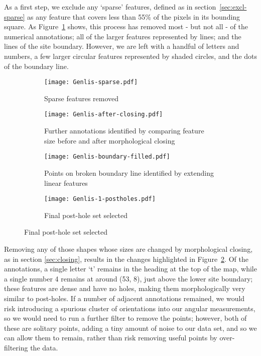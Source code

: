 \documentclass[../../ArchStats.tex]{subfiles}
\begin{document}
As a first step, we exclude any `sparse' features, defined as in section~\ref{sec:excl-sparse} as any feature that covers less than 55\% of the pixels in its bounding square. As Figure~\ref{fig:Genlis-f-ext-sparse-removed} shows, this process has removed most - but not all - of the numerical annotations; all of the larger features represented by lines; and the lines of the site boundary. However, we are left with a handful of letters and numbers, a few larger circular features represented by shaded circles, and the dots of the boundary line.

\begin{figure}[h!]
\centering
\caption{Stages of post-hole feature identification process for the Genlis site plan. After data cleaning, we are left with 243 post-holes.}
\label{fig:Genlis-f-ext}
%
\begin{subfigure}[b]{0.46\textwidth}
\caption{Sparse features removed}
\label{fig:Genlis-f-ext-sparse-removed}
\centering
\texttt{[image: Genlis-sparse.pdf]}
\end{subfigure}
%
\begin{subfigure}[b]{0.46\textwidth}
\caption{Further annotations identified by comparing feature size before and after morphological closing}
\label{fig:Genlis-f-ext-closed}
\centering
\texttt{[image: Genlis-after-closing.pdf]}
\end{subfigure}

\vspace{10pt}
%
\begin{subfigure}[b]{0.46\textwidth}
\caption{Points on broken boundary line identified by extending linear features}
\label{fig:Genlis-f-ext-boundary}
\centering
\texttt{[image: Genlis-boundary-filled.pdf]}
\end{subfigure}
%
\begin{subfigure}[b]{0.46\textwidth}
\caption{Final post-hole set selected}
\label{fig:Genlis-f-ext-postholes}
\centering
\texttt{[image: Genlis-1-postholes.pdf]}
\end{subfigure}
%
\end{figure}

Removing any of those shapes whose sizes are changed by morphological closing, as in section \ref{sec:closing}, results in the changes highlighted in Figure~\ref{fig:Genlis-f-ext-closed}. Of the annotations, a single letter `t' remains in the heading at the top of the map, while a single number 4 remains at around (53, 8), just above the lower site boundary; these features are dense and have no holes, making them morphologically very similar to post-holes. If a number of adjacent annotations remained, we would risk introducing a spurious  cluster of orientations into our angular measurements, so we would need to run a further filter to remove the points; however, both of these are solitary points, adding a tiny amount of noise to our data set, and so we can allow them to remain, rather than risk removing useful points by over-filtering the data.
\end{document}
